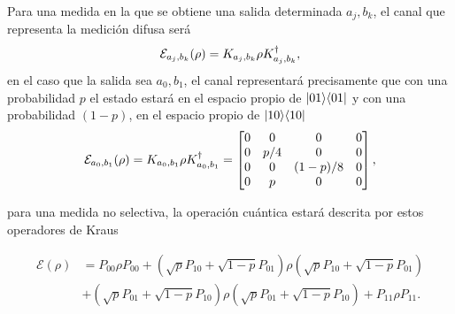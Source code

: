 Para una medida en la que se obtiene una salida determinada $a_j,b_k$, el canal que representa la medición difusa será \[\mathcal{E}_{a_j,b_k}(\rho)=K_{a_j,b_k}\rho K_{a_j,b_k}^\dagger,\]
en el caso que la salida sea $a_0,b_1$, el canal representará precisamente que con una probabilidad $p$ el estado estará en el espacio propio de $|01\rangle \langle 01|$ y con una probabilidad $(1-p)$, en el espacio propio de $|10\rangle \langle10|$
\[\mathcal{E}_{a_0,b_1}(\rho)=K_{a_0,b_1}\rho K_{a_0,b_1}^\dagger=\begin{bmatrix}
    0&0&0&0\\
    0&p/4&0&0\\
    0&0&(1-p)/8&0\\
    0&p&0&0\\
\end{bmatrix},\]



para una medida no selectiva, la operación cuántica estará descrita por estos operadores de Kraus

\[
\begin{split}
    \mathcal{E}(\rho)&=  P_{00}\rho P_{00}+(\sqrt{p}P_{10}+\sqrt{1-p}P_{01})\rho(\sqrt{p}P_{10}+\sqrt{1-p}P_{01})\\
    &+ (\sqrt{p}P_{01}+\sqrt{1-p}P_{10})\rho (\sqrt{p} P_{01}+\sqrt{1-p}P_{10})+P_{11}\rho P_{11}.\\
\end{split}
\]


